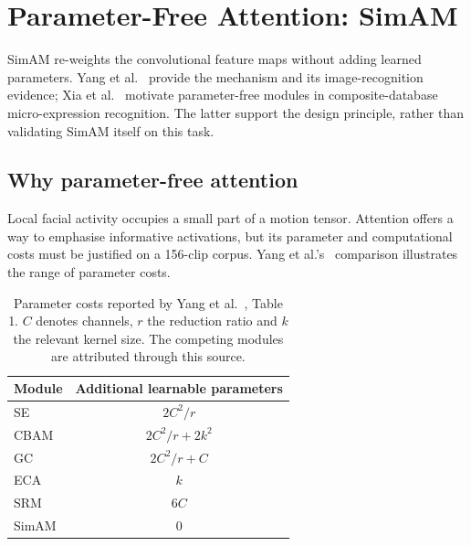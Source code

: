 
\section{Parameter-Free Attention: SimAM}
\label{sec:simam-review}

SimAM re-weights the convolutional feature maps without adding learned parameters. Yang et al.~\cite{yang2021} provide the mechanism and its image-recognition evidence; Xia et al.~\cite{xia2020b} motivate parameter-free modules in composite-database micro-expression recognition. The latter support the design principle, rather than validating SimAM itself on this task.

\subsection{Why parameter-free attention}
\label{sec:simam-why}

Local facial activity occupies a small part of a motion tensor. Attention offers a way to emphasise informative activations, but its parameter and computational costs must be justified on a 156-clip corpus. Yang et al.'s~\cite{yang2021} comparison illustrates the range of parameter costs.

\begin{table}[htbp]
    \centering
    \small
    \begin{tabular}{@{}lc@{}}
        \hline
        \textbf{Module} & \textbf{Additional learnable parameters} \\
        \hline
        SE & $2C^2/r$ \\
        CBAM & $2C^2/r+2k^2$ \\
        GC & $2C^2/r+C$ \\
        ECA & $k$ \\
        SRM & $6C$ \\
        SimAM & $0$ \\
        \hline
    \end{tabular}
    \caption[Parameter costs of attention modules]{Parameter costs reported by Yang et al.~\cite{yang2021}, Table 1. $C$ denotes channels, $r$ the reduction ratio and $k$ the relevant kernel size. The competing modules are attributed through this source.}
    \label{tab:attention-modules}
\end{table}

